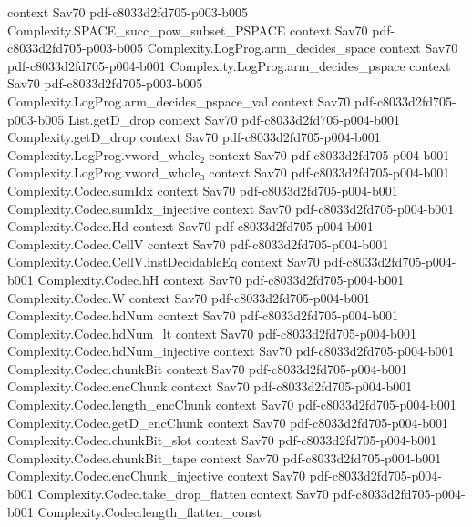 \begin{theorem}
  {context}
  {Sav70}
  {pdf-c8033d2fd705-p003-b005}
\proofstep
  {Complexity.SPACE_succ_pow_subset_PSPACE}
  {context}
  {Sav70}
  {pdf-c8033d2fd705-p003-b005}
\proofstep
  {Complexity.LogProg.arm_decides_space}
  {context}
  {Sav70}
  {pdf-c8033d2fd705-p004-b001}
\proofstep
  {Complexity.LogProg.arm_decides_pspace}
  {context}
  {Sav70}
  {pdf-c8033d2fd705-p003-b005}
\proofstep
  {Complexity.LogProg.arm_decides_pspace_val}
  {context}
  {Sav70}
  {pdf-c8033d2fd705-p003-b005}
\proofstep
  {List.getD_drop}
  {context}
  {Sav70}
  {pdf-c8033d2fd705-p004-b001}
\proofstep
  {Complexity.getD_drop}
  {context}
  {Sav70}
  {pdf-c8033d2fd705-p004-b001}
\proofstep
  {Complexity.LogProg.vword_whole₂}
  {context}
  {Sav70}
  {pdf-c8033d2fd705-p004-b001}
\proofstep
  {Complexity.LogProg.vword_whole₃}
  {context}
  {Sav70}
  {pdf-c8033d2fd705-p004-b001}
\proofstep
  {Complexity.Codec.sumIdx}
  {context}
  {Sav70}
  {pdf-c8033d2fd705-p004-b001}
\proofstep
  {Complexity.Codec.sumIdx_injective}
  {context}
  {Sav70}
  {pdf-c8033d2fd705-p004-b001}
\proofstep
  {Complexity.Codec.Hd}
  {context}
  {Sav70}
  {pdf-c8033d2fd705-p004-b001}
\proofstep
  {Complexity.Codec.CellV}
  {context}
  {Sav70}
  {pdf-c8033d2fd705-p004-b001}
\proofstep
  {Complexity.Codec.CellV.instDecidableEq}
  {context}
  {Sav70}
  {pdf-c8033d2fd705-p004-b001}
\proofstep
  {Complexity.Codec.hH}
  {context}
  {Sav70}
  {pdf-c8033d2fd705-p004-b001}
\proofstep
  {Complexity.Codec.W}
  {context}
  {Sav70}
  {pdf-c8033d2fd705-p004-b001}
\proofstep
  {Complexity.Codec.hdNum}
  {context}
  {Sav70}
  {pdf-c8033d2fd705-p004-b001}
\proofstep
  {Complexity.Codec.hdNum_lt}
  {context}
  {Sav70}
  {pdf-c8033d2fd705-p004-b001}
\proofstep
  {Complexity.Codec.hdNum_injective}
  {context}
  {Sav70}
  {pdf-c8033d2fd705-p004-b001}
\proofstep
  {Complexity.Codec.chunkBit}
  {context}
  {Sav70}
  {pdf-c8033d2fd705-p004-b001}
\proofstep
  {Complexity.Codec.encChunk}
  {context}
  {Sav70}
  {pdf-c8033d2fd705-p004-b001}
\proofstep
  {Complexity.Codec.length_encChunk}
  {context}
  {Sav70}
  {pdf-c8033d2fd705-p004-b001}
\proofstep
  {Complexity.Codec.getD_encChunk}
  {context}
  {Sav70}
  {pdf-c8033d2fd705-p004-b001}
\proofstep
  {Complexity.Codec.chunkBit_slot}
  {context}
  {Sav70}
  {pdf-c8033d2fd705-p004-b001}
\proofstep
  {Complexity.Codec.chunkBit_tape}
  {context}
  {Sav70}
  {pdf-c8033d2fd705-p004-b001}
\proofstep
  {Complexity.Codec.encChunk_injective}
  {context}
  {Sav70}
  {pdf-c8033d2fd705-p004-b001}
\proofstep
  {Complexity.Codec.take_drop_flatten}
  {context}
  {Sav70}
  {pdf-c8033d2fd705-p004-b001}
\proofstep
  {Complexity.Codec.length_flatten_const}

\end{theorem}
